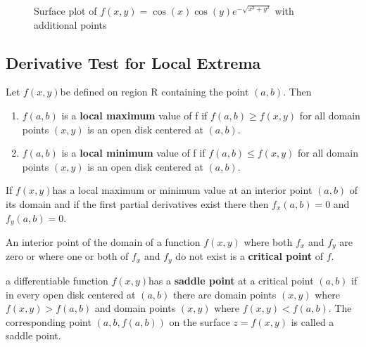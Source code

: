 \documentclass[12pt,a4paper,draft]{article}
\newenvironment{definition}{\begin{definitionbox}}{\end{definitionbox}\vspace{1\baselineskip}}
\newenvironment{theorem}{\begin{theorembox}}{\end{theorembox}\vspace{1\baselineskip}}
\newcommand{\fxy}{\(f(x,y)\)}
\begin{document}
\begin{figure}[h]
    \centering
    \caption{Surface plot of $f(x,y) = \cos(x)\cos(y)e^{-\sqrt{x^2 + y^2}}$ with additional points}
\end{figure}


\subsection{Derivative Test for Local Extrema}

\begin{definition}
    Let \fxy be defined on region R containing the point \((a,b)\). Then
    \begin{enumerate}
        \item \(f(a,b)\) is a \textbf{local maximum} value of f if \(f(a,b) \geq f(x,y)\) for all domain points \((x,y)\) is an open disk centered at \((a,b)\).
        \item \(f(a,b)\) is a \textbf{local minimum} value of f if \(f(a,b) \leq f(x,y)\) for all domain points \((x,y)\) is an open disk centered at \((a,b)\).
    \end{enumerate}
\end{definition}


\begin{theorem}
    If \fxy has a local maximum or minimum value at an interior point \((a,b)\) of its domain and if the first partial derivatives exist there then \(f_x(a,b)=0\) and  \(f_y(a,b)=0\).
\end{theorem}


\begin{definition}
    An interior point of the domain of a function \(f(x,y)\) where both \(f_x\) and  \(f_y\) are zero or where one or both of \(f_x\) and  \(f_y\) do not exist is a \textbf{critical point } of \(f\).
\end{definition}


\begin{definition}
    a differentiable function \fxy has a \textbf{saddle point} at a critical point \((a,b)\) if in every open disk centered at \((a,b)\) there are domain points \((x,y)\) where \(f(x,y) > f(a,b)\) and domain points \((x,y)\) where \(f(x,y) < f(a,b)\). The corresponding point \((a, b, f(a,b))\) on the surface \(z = f(x,y)\) is called a saddle point.
\end{definition}
\end{document}
